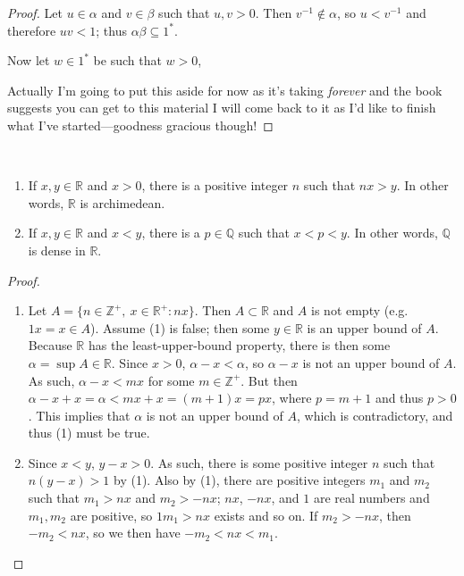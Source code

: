 \documentclass[12pt]{article}
\begin{document}
\begin{thm}
\begin{proof}
    Let $u \in \alpha$ and $v \in \beta$ such that $u,v > 0$. Then $v^{-1} \notin
    \alpha$, so $u < v^{-1}$ and therefore $uv < 1$; thus $\alpha\beta \subseteq
    1^*$.

    Now let $w \in 1^*$ be such that $w > 0$,

    Actually I'm going to put this aside for now as it's taking \textit{forever} and
    the book suggests you can get to this material  I will come back to it as I'd like to finish what I've started—goodness
    gracious though!
  \end{proof}
\end{thm}

\begin{thm} \label{thm:rarchqdenseinr}
  \
  \begin{enumerate}
    \item
      If $x,y \in \mathbb{R}$ and $x > 0$, there is a positive integer $n$ such that
      $nx > y$. In other words, $\mathbb{R}$ is archimedean.
    \item
      If $x,y \in \mathbb{R}$ and $x < y$, there is a $p \in \mathbb{Q}$ such that $x
      < p < y$. In other words, $\mathbb{Q}$ is dense in $\mathbb{R}$.
  \end{enumerate}

  \begin{proof}
    \
    \begin{enumerate}
      \item
        Let $A = \{n \in \mathbb{Z}^+,\ x \in \mathbb{R}^+: nx\}$. Then $A \subset
        \mathbb{R}$ and $A$ is not empty (e.g. $1x = x \in A$). Assume (1) is false;
        then some $y \in \mathbb{R}$ is an upper bound of $A$. Because $\mathbb{R}$
        has the least-upper-bound property, there is then some $\alpha = \sup A \in
        \mathbb{R}$. Since $x > 0$, $\alpha - x < \alpha$, so $\alpha - x$ is not an
        upper bound of $A$. As such, $\alpha - x < mx$ for some $m \in \mathbb{Z}^+$.
        But then $\alpha - x + x = \alpha < mx + x = (m + 1)x = px$, where $p = m +
        1$ and thus $p > 0$. This implies that $\alpha$ is not an upper bound of $A$,
        which is contradictory, and thus (1) must be true.

      \item
        Since $x < y$, $y - x > 0$. As such, there is some positive integer $n$ such
        that $n(y - x) > 1$ by (1).  Also by (1), there are positive integers $m_1$
        and $m_2$ such that $m_1 > nx$ and $m_2 > -nx$; $nx$, $-nx$, and $1$ are real
        numbers and $m_1,m_2$ are positive, so $1m_1 > nx$ exists and so on. If $m_2
        > -nx$, then $-m_2 < nx$, so we then have $-m_2 < nx < m_1$.


\end{enumerate}
\end{proof}
\end{thm}
\end{document}
